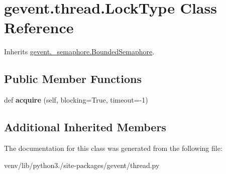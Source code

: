 \hypertarget{classgevent_1_1thread_1_1_lock_type}{}\section{gevent.\+thread.\+Lock\+Type Class Reference}
\label{classgevent_1_1thread_1_1_lock_type}


Inherits \hyperlink{classgevent_1_1__semaphore_1_1_bounded_semaphore}{gevent.\+\_\+semaphore.\+Bounded\+Semaphore}.

\subsection*{Public Member Functions}
\begin{DoxyCompactItemize}
\item 
\mbox{\label{classgevent_1_1thread_1_1_lock_type_afa8e4beadff2f1973ae2af069c7aa8e7}} 
def {\bfseries acquire} (self, blocking=True, timeout=-\/1)
\end{DoxyCompactItemize}
\subsection*{Additional Inherited Members}


The documentation for this class was generated from the following file\+:\begin{DoxyCompactItemize}
\item 
venv/lib/python3./site-\/packages/gevent/thread.\+py\end{DoxyCompactItemize}
